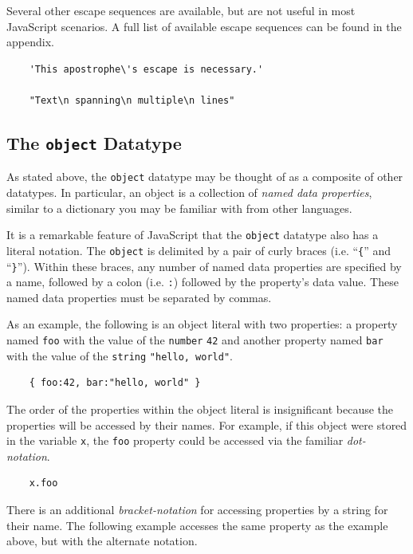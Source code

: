 \documentclass[11pt,letter]{book}
\begin{document}
    Several other escape sequences are available, but are not useful in most JavaScript scenarios. 
    A full list of available escape sequences can be found in the appendix.
    
    \begin{verbatim}
    'This apostrophe\'s escape is necessary.'
    
    "Text\n spanning\n multiple\n lines"
    \end{verbatim}
    
    \subsection{The \texttt{object} Datatype}
    
    As stated above, the \texttt{object} datatype may be thought of as a composite of other 
    datatypes. In particular, an object is a collection of \emph{named data properties}, similar
    to a dictionary you may be familiar with from other languages.
    
    It is a remarkable feature of JavaScript that the \texttt{object} datatype also has a literal
    notation. The \texttt{object} is delimited by a pair of curly braces (i.e. ``\texttt{\{}'' and 
    ``\texttt{\}}''). Within these braces, any number of named data properties are specified by a 
    name, followed by a colon (i.e. \texttt{:}) followed by the property's data value. These named 
    data properties must be separated by commas.
    
    As an example, the following is an object literal with two properties: a property named 
    \texttt{foo} with the value of the \texttt{number} \texttt{42} and another property named 
    \texttt{bar} with the value of the \texttt{string} \texttt{"hello, world"}.
    
    \begin{verbatim}
    { foo:42, bar:"hello, world" }
    \end{verbatim}
    
    The order of the properties within the object literal is insignificant because the properties
    will be accessed by their names. For example, if this object were stored in the variable 
    \texttt{x}, the \texttt{foo} property could be accessed via the familiar \emph{dot-notation}.
    
    \begin{verbatim}
    x.foo
    \end{verbatim}
    
    There is an additional \emph{bracket-notation} for accessing properties by a string for their 
    name. The following example accesses the same property as the example above, but with the 
    alternate notation.
    
\end{document}
